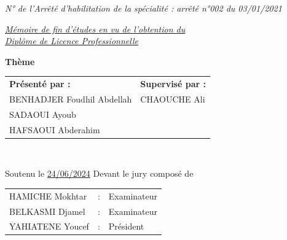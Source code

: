 \documentclass[12pt,a4paper,final]{report}
\begin{document}
\begin{titlepage}
\begin{center}
    {\small \textit{N° de l'Arrêté d'habilitation de la spécialité : arrêté n°002 du 03/01/2021}} \\
    \vspace{0.7cm}
    
    {\large \textit{\underline{Mémoire de fin d'études en vu de l'obtention du}}} \\
    {\large \textit{\underline{Diplôme de Licence Professionnelle}}} \\
    \vspace{0.7cm}
    
    {\LARGE \textbf{Thème}} \\
    \vspace{0.6cm}
    
    \vspace{0.8cm}

    \begin{tabular}{p{8cm}p{6cm}}
        \textbf{Présenté par :} & \textbf{Supervisé par :} \\
        BENHADJER Foudhil Abdellah & CHAOUCHE Ali \\
        SADAOUI Ayoub & \\
        HAFSAOUI Abderahim & \\
    \end{tabular} \\
    \vspace{0.8cm}
    
    {\normalsize Soutenu le \underline{24/06/2024} Devant le jury composé de} \\
    \vspace{0.4cm}
    \begin{tabular}{lll}
        HAMICHE Mokhtar & : & Examinateur \\
        BELKASMI Djamel & : & Examinateur \\
        YAHIATENE Youcef & : & Président \\
    \end{tabular}
\end{center}
\end{titlepage}
\end{document}
